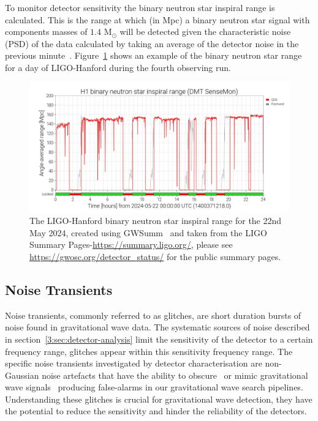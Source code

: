 To monitor detector sensitivity the binary neutron star inspiral range is calculated. This is the range at which (in Mpc) a binary neutron star signal with components masses of $1.4$ M$_{\odot}$ will be detected given the characteristic noise (PSD) of the data calculated by taking an average of the detector noise in the previous minute~\cite{range_calculation:2003, ota:2023}. Figure~\ref{3:fig:bns_range} shows an example of the binary neutron star range for a day of LIGO-Hanford during the fourth observing run.
%
\begin{figure}
    \centering
    \includegraphics[width=1.0\linewidth]{images/3_detector_characterisation/may22_bns_range.png}
    \caption{The LIGO-Hanford binary neutron star inspiral range for the 22nd May 2024, created using GWSumm~\cite{gwsumm:2024} and taken from the LIGO Summary Pages-\href{https://summary.ligo.org/}{https://summary.ligo.org/}, please see \href{https://gwosc.org/detector_status/}{https://gwosc.org/detector\_status/} for the public summary pages.}
    \label{3:fig:bns_range}
\end{figure}
%

\subsection{\label{3:sec:noise-transients}Noise Transients}


Noise transients, commonly referred to as glitches, are short duration bursts of noise found in gravitational wave data. The systematic sources of noise described in section~\ref{3:sec:detector-analysis} limit the sensitivity of the detector to a certain frequency range, glitches appear within this sensitivity frequency range. The specific noise transients investigated by detector characterisation are non-Gaussian noise artefacts that have the ability to obscure~\cite{GW170817:2017} or mimic gravitational wave signals~\cite{GWMimicking:2010} producing false-alarms in our gravitational wave search pipelines. Understanding these glitches is crucial for gravitational wave detection, they have the potential to reduce the sensitivity and hinder the reliability of the detectors.
%
%

